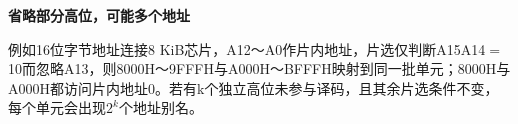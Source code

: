 {\color{ink}\bfseries 省略部分高位，可能多个地址}\par\vspace{1bp}例如16位字节地址连接8 KiB芯片，A12～A0作片内地址，片选仅判断A15A14\(=\allowbreak{}\)10而忽略A13，则8000H～9FFFH与A000H～BFFFH映射到同一批单元；8000H与A000H都访问片内地址0。若有k个独立高位未参与译码，且其余片选条件不变，每个单元会出现\(2^{k}\)个地址别名。
